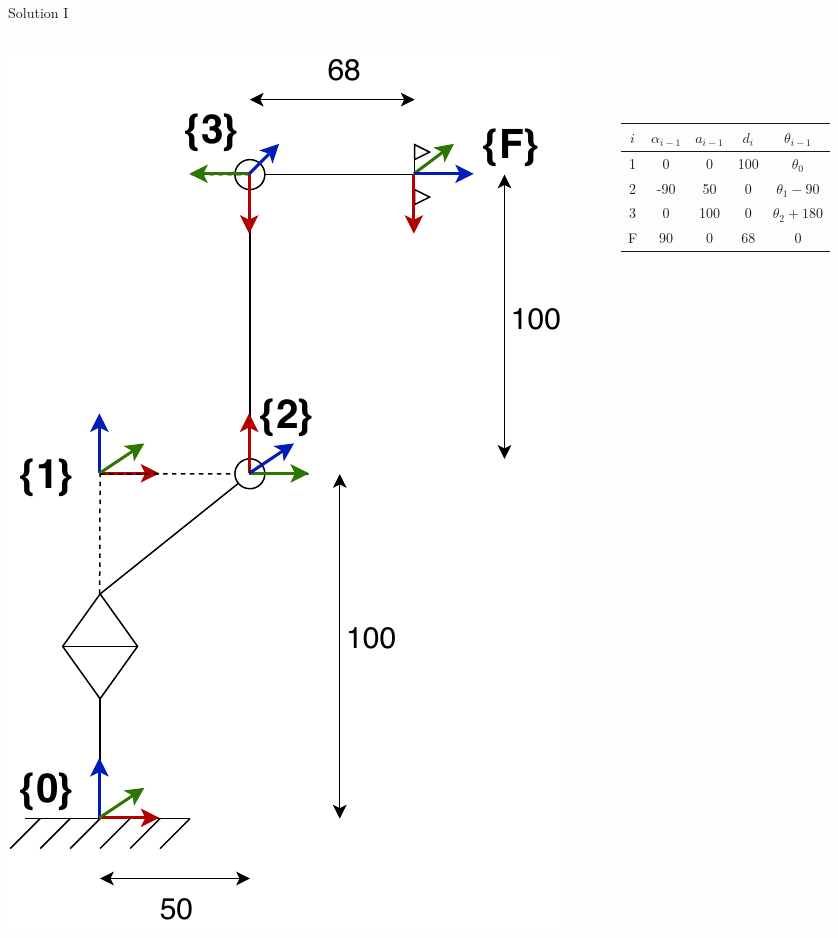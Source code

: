 \documentclass{beamer}
\begin{document}
\begin{frame}{Solution I}

\begin{columns}[T] %
	\begin{column}{.48\textwidth}
		\begin{center}
			\includegraphics[width=\textwidth,height=0.8\textheight,keepaspectratio]{images/robot_axis_coord.pdf}
		\end{center}
		
	\end{column}%
	\hfill%
	\begin{column}{.45\textwidth}
		~\\~\\~\\
		\begin{center}
			\begin{tabular}{ c c c c c }
				$i$ & $\alpha_{i-1}$ & $a_{i-1}$ & $d_i$ & $\theta_{i-1}$\\ 
				\hline
				1 & 0 & 0 & 100 & $\theta_0$\\  
				2 & -90 & 50 & 0 & $\theta_1 - 90$\\ 
				3 & 0 & 100 & 0 & $\theta_2 + 180$\\ 
				F & 90 & 0 & 68 & $0$
			\end{tabular}
		\end{center}


\end{column}
\end{columns}
\end{frame}
\end{document}
